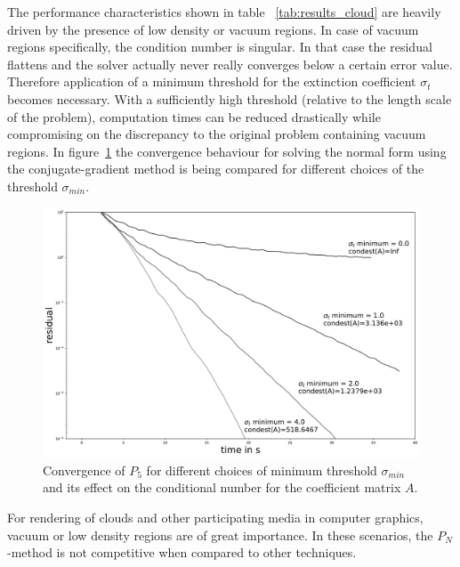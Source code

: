 The performance characteristics shown in table 
~\ref{tab:results_cloud} are heavily driven by the presence of low density or vacuum regions. In case of vacuum regions specifically, the condition number is singular. In that case the residual flattens and the solver actually never really converges below a certain error value. Therefore application of a minimum threshold for the extinction coefficient $\sigma_t$ becomes necessary. With a sufficiently high threshold (relative to the length scale of the problem), computation times can be reduced drastically while compromising on the discrepancy to the original problem containing vacuum regions. In figure~\ref{fig:pn_results_convergence} the convergence behaviour for solving the normal form using the conjugate-gradient method is being compared for different choices of the threshold $\sigma_{min}$.
\begin{figure}[h]
\centering
\includegraphics[width=\columnwidth]{04_pn_method/results/fig_nebulae_p1_convergence.pdf}
\caption{Convergence of $P_5$ for different choices of minimum threshold $\sigma_{min}$ and its effect on the conditional number for the coefficient matrix $A$.}
\label{fig:pn_results_convergence}
\end{figure}

For rendering of clouds and other participating media in computer graphics, vacuum or low density regions are of great importance. In these scenarios, the $P_N$-method is not competitive when compared to other techniques.






